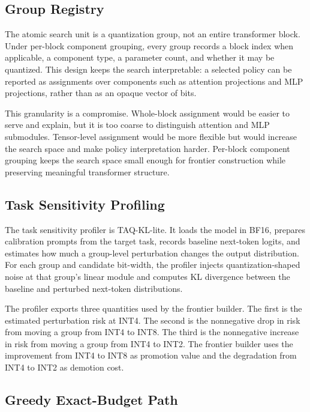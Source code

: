 \documentclass{article}
\newcommand{\inttwo}{INT2}
\newcommand{\intfour}{INT4}
\newcommand{\inteight}{INT8}
\begin{document}
\subsection{Group Registry}

The atomic search unit is a quantization group, not an entire transformer block. Under per-block component grouping, every group records a block index when applicable, a component type, a parameter count, and whether it may be quantized. This design keeps the search interpretable: a selected policy can be reported as assignments over components such as attention projections and MLP projections, rather than as an opaque vector of bits.

This granularity is a compromise. Whole-block assignment would be easier to serve and explain, but it is too coarse to distinguish attention and MLP submodules. Tensor-level assignment would be more flexible but would increase the search space and make policy interpretation harder. Per-block component grouping keeps the search space small enough for frontier construction while preserving meaningful transformer structure.

\subsection{Task Sensitivity Profiling}

The task sensitivity profiler is TAQ-KL-lite. It loads the model in BF16, prepares calibration prompts from the target task, records baseline next-token logits, and estimates how much a group-level perturbation changes the output distribution. For each group and candidate bit-width, the profiler injects quantization-shaped noise at that group's linear module and computes KL divergence between the baseline and perturbed next-token distributions.

The profiler exports three quantities used by the frontier builder. The first is the estimated perturbation risk at \intfour{}. The second is the nonnegative drop in risk from moving a group from \intfour{} to \inteight{}. The third is the nonnegative increase in risk from moving a group from \intfour{} to \inttwo{}. The frontier builder uses the improvement from \intfour{} to \inteight{} as promotion value and the degradation from \intfour{} to \inttwo{} as demotion cost.

\subsection{Greedy Exact-Budget Path}
\end{document}
